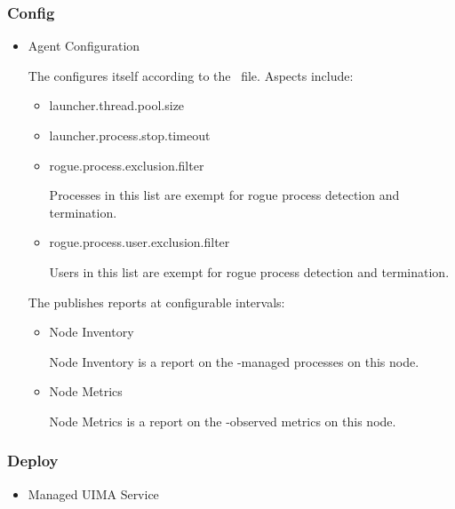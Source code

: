 \begin{itemize}
    \subsubsection{Config}     
    
    \begin{itemize}
      \item Agent Configuration
      
      The \varAgent configures itself according to the 
      \varDuccProperties~file.  Aspects include:
      
      \begin{itemize}
        \item launcher.thread.pool.size
        \item launcher.process.stop.timeout
        \item rogue.process.exclusion.filter
        
        Processes in this list are exempt for rogue process detection
        and termination.
        
        \item rogue.process.user.exclusion.filter
        
        Users in this list are exempt for rogue process detection
        and termination.
        
      \end{itemize} 
      
      The \varAgent publishes reports at configurable intervals:
      
      \begin{itemize}
        \item Node Inventory
        
        Node Inventory is a report on the \varAgent-managed processes
        on this node.
        
        \item Node Metrics
        
        Node Metrics is a report on the \varAgent-observed metrics
        on this node.
        
      \end{itemize} 
      
    \end{itemize}  
            
    \subsubsection{Deploy}
    
    \begin{itemize}
      \item Managed UIMA Service
      

\end{itemize}
\end{itemize}
